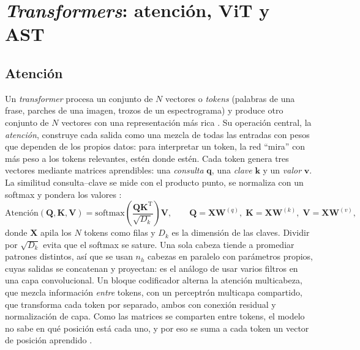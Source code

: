 \section{\textit{Transformers}: atención, ViT y AST}\label{sec:teoria-transformers}

\subsection{Atención}

Un \textit{transformer} procesa un conjunto de $N$ vectores o
\emph{tokens} (palabras de una frase, parches de una imagen, trozos de un
espectrograma) y produce otro conjunto de $N$ vectores con una
representación más rica \citep[p.~357]{bishop2024deep}. Su operación
central, la \emph{atención}, construye cada salida como una mezcla de todas
las entradas con pesos que dependen de los propios datos: para interpretar
un token, la red ``mira'' con más peso a los tokens relevantes, estén donde
estén. Cada token genera tres vectores mediante matrices aprendibles: una
\emph{consulta} $\mathbf{q}$, una \emph{clave} $\mathbf{k}$ y un \emph{valor}
$\mathbf{v}$. La similitud consulta--clave se mide con el producto punto, se
normaliza con un softmax y pondera los valores
\citep{vaswani2017attention}:
\begin{equation}
  \text{Atención}(\mathbf{Q}, \mathbf{K}, \mathbf{V}) =
  \mathrm{softmax}\!\left(\frac{\mathbf{Q}\mathbf{K}^{\mathrm{T}}}{\sqrt{D_k}}\right)\mathbf{V},
  \qquad \mathbf{Q} = \mathbf{X}\mathbf{W}^{(q)},\;
  \mathbf{K} = \mathbf{X}\mathbf{W}^{(k)},\;
  \mathbf{V} = \mathbf{X}\mathbf{W}^{(v)},
  \label{eq:attention}
\end{equation}
donde $\mathbf{X}$ apila los $N$ tokens como filas y $D_k$ es la dimensión de
las claves. Dividir por $\sqrt{D_k}$ evita que el softmax se sature. Una
sola cabeza tiende a promediar patrones
distintos, así que se usan $n_h$ cabezas en paralelo con parámetros propios,
cuyas salidas se concatenan y proyectan: es el análogo de usar varios filtros
en una capa convolucional. Un bloque
codificador alterna la atención multicabeza, que mezcla información
\emph{entre} tokens, con un perceptrón multicapa compartido, que transforma
cada token por separado, ambos con conexión residual y normalización de
capa. Como las matrices se comparten entre tokens, el modelo no sabe en qué
posición está cada uno, y por eso se suma a cada token un vector de posición
aprendido \citep[pp.~366--374]{bishop2024deep}.

